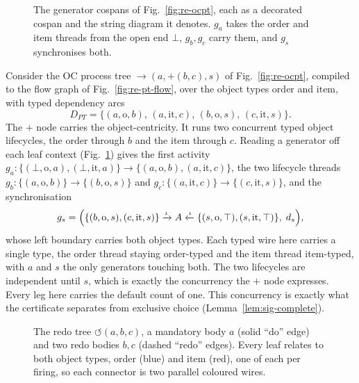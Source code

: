 \begin{figure}[tp]
  \centering
  \unskip
  \caption{The generator cospans of Fig.~\ref{fig:re-ocpt}, each as a decorated cospan and the
    string diagram it denotes. $g_a$ takes the order and item threads from the open end $\bot$, $g_b,g_c$ carry them, and
    $g_s$ synchronises both.}
  \label{fig:re-ocpt-cospans}
\end{figure}

\begin{exmp}
  \label{ex:running-ptree-cospan}
  Consider the OC process tree $\to(a, +(b,c), s)$ of Fig.~\ref{fig:re-ocpt}, compiled to the
  flow graph of Fig.~\ref{fig:re-pt-flow}, over the object types $\mathrm{order}$ and
  $\mathrm{item}$, with typed dependency arcs
  \[
    D_{PT} = \{(a,\mathrm{o},b),\,(a,\mathrm{it},c),\,
      (b,\mathrm{o},s),\,(c,\mathrm{it},s)\}.
  \]
  The $+$ node carries the object-centricity. It runs two concurrent typed
  object lifecycles, the order through $b$ and the item through $c$. Reading a
  generator off each leaf context (Fig.~\ref{fig:re-ocpt-cospans}) gives the first activity
  $g_a:\{(\bot,\mathrm{o},a),(\bot,\mathrm{it},a)\}\to\{(a,\mathrm{o},b),(a,\mathrm{it},c)\}$, the two lifecycle
  threads $g_b:\{(a,\mathrm{o},b)\}\to\{(b,\mathrm{o},s)\}$ and
  $g_c:\{(a,\mathrm{it},c)\}\to\{(c,\mathrm{it},s)\}$, and the synchronisation
  \begin{gather*}
    g_s = \Bigl(\{(b,\mathrm{o},s),(c,\mathrm{it},s)\}
      \xrightarrow{\iota} A \xleftarrow{\iota}  \{(s,\mathrm{o},\top),(s,\mathrm{it},\top)\},\; d_s\Bigr),
  \end{gather*}
  whose left boundary carries both object types. Each typed wire here carries a single type,
  the order thread staying order-typed and the item thread item-typed, with $a$ and $s$ the only
  generators touching both. The two lifecycles are independent until $s$, which is exactly the
  concurrency the $+$ node expresses. Every leg here carries the default count of one.
  This concurrency is exactly what the certificate separates from exclusive choice (Lemma~\ref{lem:sig-complete}).
\end{exmp}

\begin{figure}[tb]
  \centering
  \unskip
  \caption{The redo tree $\circlearrowleft(a,b,c)$, a mandatory body $a$ (solid ``do'' edge) and two
    redo bodies $b,c$ (dashed ``redo'' edges). Every leaf relates to both object types, order (blue) and
    item (red), one of each per firing, so each connector is two parallel coloured wires.}
  \label{fig:re-loop-tree}
\end{figure}


